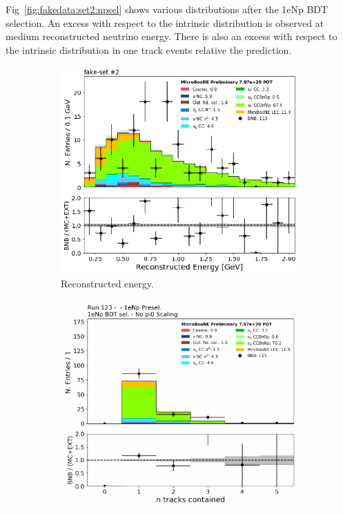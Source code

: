 Fig~\ref{fig:fakedata:set2:npsel} shows various distributions after the 1eNp BDT selection.  An excess with respect to the \nue intrinsic distribution is observed at medium reconstructed neutrino energy. There is also an excess with respect to the \nue intrinsic distribution in one track events relative the prediction.

\begin{figure}[H] 
\begin{center}
    \begin{subfigure}[b]{0.45\textwidth}
    \centering
    \includegraphics[width=1.00\textwidth]{Fakedata/set2/Np_postsel_recoe.pdf}
    \caption{\label{fig:fakedata:set2:Np_postsel_recoe} Reconstructed energy.}
    \end{subfigure}
    \begin{subfigure}[b]{0.45\textwidth}
    \centering
    \includegraphics[width=1.00\textwidth]{Fakedata/set2/Np_postsel_ntracks.pdf}

\end{subfigure}
\end{center}
\end{figure}
